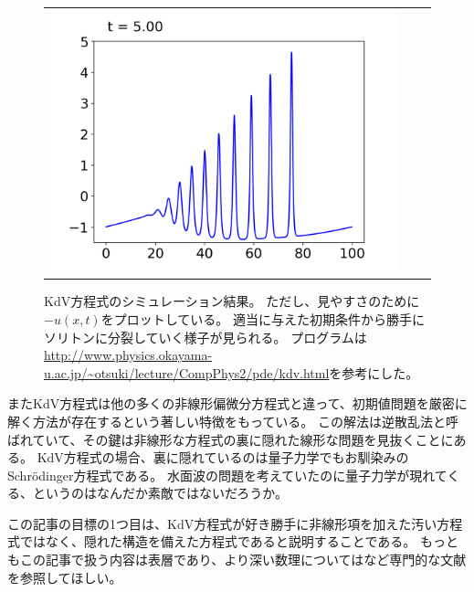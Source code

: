 \documentclass[11pt]{ltjsarticle}
\numberwithin{equation}{section}
\begin{document}
\begin{figure}[H]
\begin{tabular}{ccc}
\begin{minipage}[b]{0.33\hsize}
        \includegraphics[width=\hsize]{../images/kdv_2.png}
    \end{minipage}
    \end{tabular}
    \caption{
    KdV方程式のシミュレーション結果。
    ただし、見やすさのために$-u(x,t)$をプロットしている。
    適当に与えた初期条件から勝手にソリトンに分裂していく様子が見られる。
    プログラムは\url{http://www.physics.okayama-u.ac.jp/~otsuki/lecture/CompPhys2/pde/kdv.html}を参考にした。
    }
\end{figure}

またKdV方程式は他の多くの非線形偏微分方程式と違って、初期値問題を厳密に解く方法が存在するという著しい特徴をもっている。
この解法は逆散乱法と呼ばれていて、その鍵は非線形な方程式の裏に隠れた線形な問題を見抜くことにある。
KdV方程式の場合、裏に隠れているのは量子力学でもお馴染みのSchr\"odinger方程式である。
水面波の問題を考えていたのに量子力学が現れてくる、というのはなんだか素敵ではないだろうか。

この記事の目標の1つ目は、KdV方程式が好き勝手に非線形項を加えた汚い方程式ではなく、隠れた構造を備えた方程式であると説明することである。
もっともこの記事で扱う内容は表層であり、より深い数理については\cite{Nakamura}など専門的な文献を参照してほしい。
\end{document}
